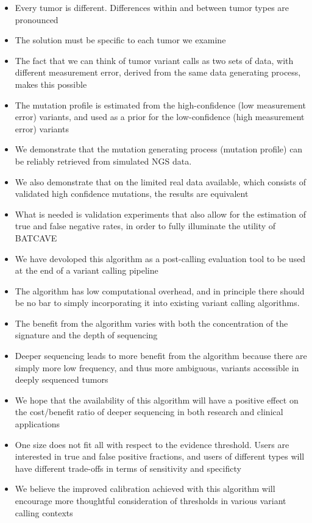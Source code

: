 \documentclass[a4,center,fleqn]{NAR}
\newcommand{\batcave}{BATCAVE }
\begin{document}
\begin{itemize}
  \item Every tumor is different. Differences within and between tumor types are pronounced \cite{@Stephens2005, @Burrell2005, @Nakamura2015, @Witkeiwicz2015, @Kumar2016}
  \item The solution must be specific to each tumor we examine
  \item The fact that we can think of tumor variant calls as two sets of data, with different measurement error, derived from the same data generating process, makes this possible
  \item The mutation profile is estimated from the high-confidence (low measurement error) variants, and used as a prior for the low-confidence (high measurement error) variants
  \item We demonstrate that the mutation generating process (mutation profile) can be reliably retrieved from simulated NGS data.
  \item We also demonstrate that on the limited real data available, which consists of validated high confidence mutations, the results are equivalent
  \item What is needed is validation experiments that also allow for the estimation of true and false negative rates, in order to fully illuminate the utility of \batcave
  \item We have devoloped this algorithm as a post-calling evaluation tool to be used at the end of a variant calling pipeline
  \item The algorithm has low computational overhead, and in principle there should be no bar to simply incorporating it into existing variant calling algorithms.
  \item The benefit from the algorithm varies with both the concentration of the signature and the depth of sequencing
  \item Deeper sequencing leads to more benefit from the algorithm because there are simply more low frequency, and thus more ambiguous, variants accessible in deeply sequenced tumors
  \item We hope that the availability of this algorithm will have a positive effect on the cost/benefit ratio of deeper sequencing in both research and clinical applications
  \item One size does not fit all with respect to the evidence threshold. Users are interested in true and false positive fractions, and users of different types will have different trade-offs in terms of sensitivity and specificty
  \item We believe the improved calibration achieved with this algorithm will encourage more thoughtful consideration of thresholds in various variant calling contexts
\end{itemize}
\end{document}
